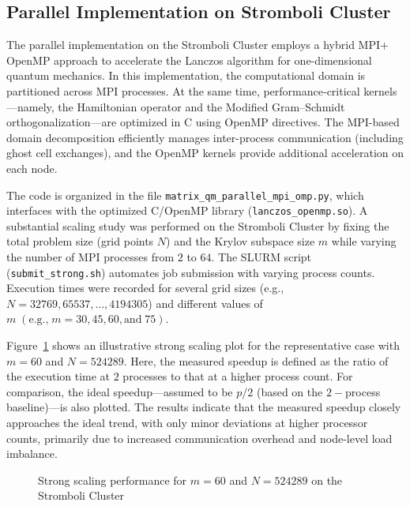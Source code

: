 \documentclass[12pt,a4paper]{report}
\begin{document}
\subsection{Parallel Implementation on Stromboli Cluster}

The parallel implementation on the Stromboli Cluster employs a hybrid MPI$+$OpenMP approach to accelerate the Lanczos algorithm for one-dimensional quantum mechanics. In this implementation, the computational domain is partitioned across MPI processes. At the same time, performance‐critical kernels—namely, the Hamiltonian operator and the Modified Gram–Schmidt orthogonalization—are optimized in C using OpenMP directives. The MPI-based domain decomposition efficiently manages inter-process communication (including ghost cell exchanges), and the OpenMP kernels provide additional acceleration on each node.

The code is organized in the file \texttt{matrix\_qm\_parallel\_mpi\_omp.py}, which interfaces with the optimized C/OpenMP library (\texttt{lanczos\_openmp.so}). A substantial scaling study was performed on the Stromboli Cluster by fixing the total problem size (grid points $N$) and the Krylov subspace size $m$ while varying the number of MPI processes from $2$ to $64$. The SLURM script (\texttt{submit\_strong.sh}) automates job submission with varying process counts. Execution times were recorded for several grid sizes (e.g., $N = 32769, 65537, \ldots, 4194305$) and different values of $m \; (\text{e.g.,} \; m=30, 45, 60, \text{and} \; 75)$.

Figure~\ref{fig:stromboli_speedup_fixed_m} shows an illustrative strong scaling plot for the representative case with $m=60$ and $N=524289$. Here, the measured speedup is defined as the ratio of the execution time at $2$ processes to that at a higher process count. For comparison, the ideal speedup—assumed to be $p/2$ (based on the $2-$process baseline)—is also plotted. The results indicate that the measured speedup closely approaches the ideal trend, with only minor deviations at higher processor counts, primarily due to increased communication overhead and node-level load imbalance.
\begin{figure}[htbp]
\centering
{}
\caption{Strong scaling performance for $m=60$ and $N=524289$ on the Stromboli Cluster}
\label{fig:stromboli_speedup_fixed_m}
\end{figure}
\end{document}
